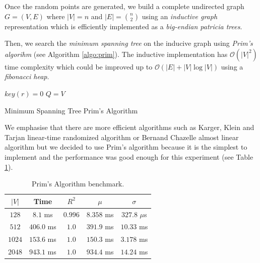 \documentclass[12pt, a4paper]{article}
\begin{document}
\newpage

Once the random points are generated, we build a complete undirected graph $G = (V, E)$ where $|V| = n$ and $|E| = \binom{n}{2}$ using an \textit{inductive graph} representation which is efficiently implemented as a \textit{big-endian patricia trees}.

Then, we search the \textit{minimum spanning tree} on the inducive graph using \textit{Prim's algorihm} (see Algorithm \ref{algo:prim}). The inductive implementation has $\mathcal{O}(|V|^2)$ time complexity which could be improved up to $\mathcal{O}(|E| + |V| \log |V|)$ using a \textit{fibonacci heap}.

\begin{algorithm}[H]
  \SetAlgoLined
  \DontPrintSemicolon
  $key(r) = 0$ 
  $Q = V$\;
  \caption{Minimum Spanning Tree Prim's Algorithm}
  \label{algo:prim}
\end{algorithm}

We emphasise that there are more efficient algorithms such as Karger, Klein and Tarjan linear-time randomized algorithm \cite{karger1995randomized} or Bernand Chazelle almost linear algorithm \cite{chazelle2000minimum} but we decided to use Prim's algorithm because it is the simplest to implement and the performance was good enough for this experiment (see Table \ref{table:1}).

\begin{table}[H]
  \center
  \begin{tabular}{ccccc}
    $|V|$  & Time       & $R^2$   & $\mu$      & $\sigma$    \\ \hline
    $128$  & $8.1$   ms & $0.996$ & $8.358$ ms & $327.8$ $\mu$s \\
    $512 $ & $406.0$ ms & $1.0  $ & $391.9$ ms & $10.33$ ms    \\
    $1024$ & $153.6$ ms & $1.0  $ & $150.3$ ms & $3.178$ ms    \\
    $2048$ & $943.1$ ms & $1.0  $ & $934.4$ ms & $14.24$ ms
  \end{tabular}
\caption{Prim's Algorithm benchmark.}
\label{table:1}
\end{table}
\end{document}
